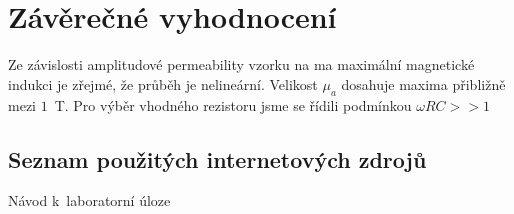 \documentclass[a4paper,12pt]{article}   %
\begin{document}
\section{Závěrečné vyhodnocení}
\label{chap:zaver}
Ze závislosti amplitudové permeability vzorku na ma maximální magnetické indukci je zřejmé, že průběh je nelineární. Velikost $\mu_a$ dosahuje maxima přibližně mezi $1$~T. Pro výběr vhodného rezistoru jsme se řídili podmínkou $\omega RC >> 1$


\clearpage
\renewcommand{\refname}{Seznam použité literatury a~zdrojů informací} 

\begin{thebibliography}{99}

\subsection*{Seznam použitých internetových zdrojů}
     Návod k~laboratorní úloze
    
\end{thebibliography}
\end{document}
